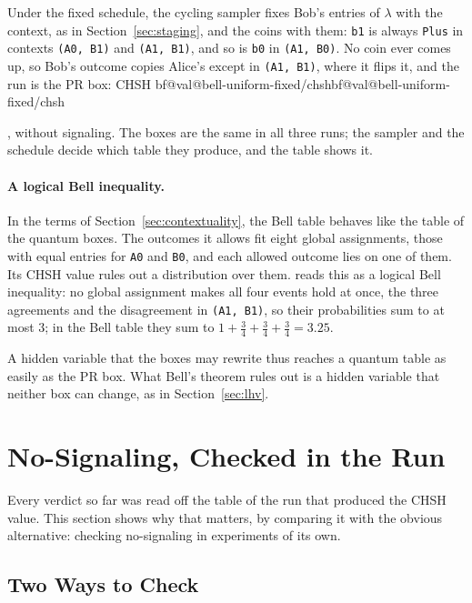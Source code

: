 \documentclass[11pt]{article}
\makeatletter
\newcommand{\hs}{\lstinline[style=hask,basicstyle=\ttfamily,frame=none]}
\newcommand{\val}[1]{\ifcsname bf@val@#1\endcsname\csname bf@val@#1\endcsname
  \else\PackageError{paper}{No value #1 in generated/values.tex}{}\fi}
\makeatother
\begin{document}
Under the fixed schedule, the cycling sampler fixes Bob's entries of $\lambda$ with the context, as in Section~\ref{sec:staging}, and the coins with them: \hs|b1| is always \hs|Plus| in contexts \hs|(A0, B1)| and \hs|(A1, B1)|, and so is \hs|b0| in \hs|(A1, B0)|. No coin ever comes up, so Bob's outcome copies Alice's except in \hs|(A1, B1)|, where it flips it, and the run is the PR box: CHSH \val{bell-uniform-fixed/chsh}, without signaling. The boxes are the same in all three runs; the sampler and the schedule decide which table they produce, and the table shows it.

\paragraph{A logical Bell inequality.} In the terms of Section~\ref{sec:contextuality}, the Bell table behaves like the table of the quantum boxes. The outcomes it allows fit eight global assignments, those with equal entries for \hs|A0| and \hs|B0|, and each allowed outcome lies on one of them. Its CHSH value rules out a distribution over them. \citet{Abramsky2017} reads this as a logical Bell inequality: no global assignment makes all four events hold at once, the three agreements and the disagreement in \hs|(A1, B1)|, so their probabilities sum to at most $3$; in the Bell table they sum to $1 + \frac34 + \frac34 + \frac34 = 3.25$.

A hidden variable that the boxes may rewrite thus reaches a quantum table as easily as the PR box. What Bell's theorem rules out is a hidden variable that neither box can change, as in Section~\ref{sec:lhv}.

\section{No-Signaling, Checked in the Run}\label{sec:checked}

Every verdict so far was read off the table of the run that produced the CHSH value. This section shows why that matters, by comparing it with the obvious alternative: checking no-signaling in experiments of its own.

\subsection{Two Ways to Check}
\end{document}

